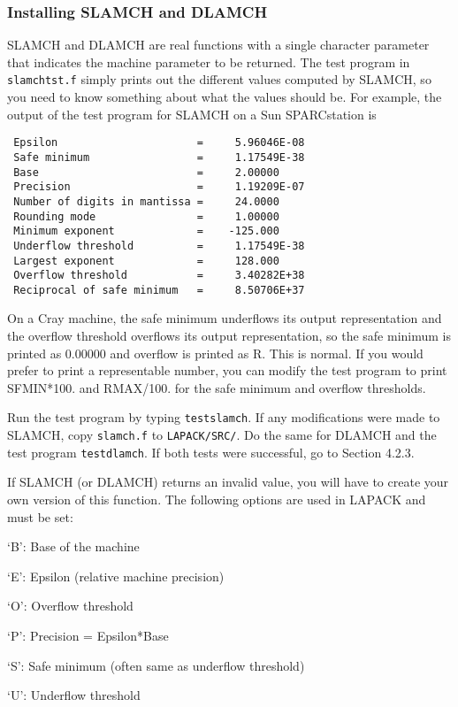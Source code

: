 \subsubsection{Installing SLAMCH and DLAMCH}
\dent
SLAMCH and DLAMCH are real functions with a single character parameter
that indicates the machine parameter to be returned.  The test 
program in {\tt slamchtst.f}
simply prints out the different values computed by SLAMCH,
so you need to know something about what the values should be. 
For example, the output of the test program for SLAMCH 
on a Sun SPARCstation is
\begin{verbatim}
 Epsilon                      =     5.96046E-08
 Safe minimum                 =     1.17549E-38
 Base                         =     2.00000
 Precision                    =     1.19209E-07
 Number of digits in mantissa =     24.0000
 Rounding mode                =     1.00000
 Minimum exponent             =    -125.000
 Underflow threshold          =     1.17549E-38
 Largest exponent             =     128.000
 Overflow threshold           =     3.40282E+38
 Reciprocal of safe minimum   =     8.50706E+37
\end{verbatim}
On a Cray machine, the safe minimum underflows its output
representation and the overflow threshold overflows its output
representation, so the safe minimum is printed as 0.00000 and overflow
is printed as R.  This is normal.
If you would prefer to print a representable number, you can modify
the test program to print SFMIN*100. and RMAX/100. for the safe
minimum and overflow thresholds.

Run the test program by typing {\tt testslamch}.
If any modifications were made to SLAMCH, copy {\tt slamch.f}
to {\tt LAPACK/SRC/}.
Do the same for DLAMCH and the test program {\tt testdlamch}.
If both tests were successful, go to Section 4.2.3.

If SLAMCH (or DLAMCH) returns an invalid value, you will have to create
your own version of this function.  The following options are used in
LAPACK and must be set:

\begin{list}{}{}
\item {`B': }  Base of the machine
\item {`E': }  Epsilon (relative machine precision)
\item {`O': }  Overflow threshold
\item {`P': }  Precision = Epsilon*Base
\item {`S': }  Safe minimum (often same as underflow threshold)
\item {`U': }  Underflow threshold
\end{list}

